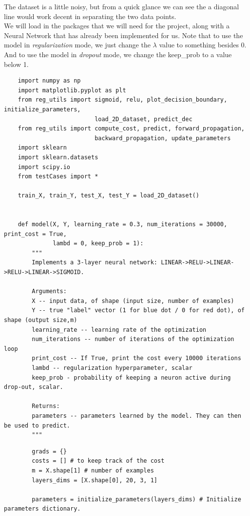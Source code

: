 \documentclass[11pt, a4paper]{article}
\begin{document}
\begin{spacing}{1.1}
\begin{minipage}[c]{8.5cm}
	\end{minipage} \vspace*{1.5mm} \newline
	The dataset is a little noisy, but from a quick glance we can see the a diagonal line would work decent in separating the two data points. \vspace*{1mm} \\
	We will load in the packages that we will need for the project, along with a Neural Network that has already been implemented for us. Note that to use the model in \textit{regularization} mode, we just change the $\lambda$ value to something besides 0. And to use the model in \textit{dropout} mode, we change the keep\_prob to a value below 1. 
	\begin{lstlisting}
	import numpy as np
	import matplotlib.pyplot as plt
	from reg_utils import sigmoid, relu, plot_decision_boundary, initialize_parameters, 
	                      load_2D_dataset, predict_dec
	from reg_utils import compute_cost, predict, forward_propagation, 
	                      backward_propagation, update_parameters
	import sklearn
	import sklearn.datasets
	import scipy.io
	from testCases import *
	
	train_X, train_Y, test_X, test_Y = load_2D_dataset()
	
	
	def model(X, Y, learning_rate = 0.3, num_iterations = 30000, print_cost = True, 
	          lambd = 0, keep_prob = 1):
		"""
		Implements a 3-layer neural network: LINEAR->RELU->LINEAR->RELU->LINEAR->SIGMOID.
		
		Arguments:
		X -- input data, of shape (input size, number of examples)
		Y -- true "label" vector (1 for blue dot / 0 for red dot), of shape (output size,m)
		learning_rate -- learning rate of the optimization
		num_iterations -- number of iterations of the optimization loop
		print_cost -- If True, print the cost every 10000 iterations
		lambd -- regularization hyperparameter, scalar
		keep_prob - probability of keeping a neuron active during drop-out, scalar.
		
		Returns:
		parameters -- parameters learned by the model. They can then be used to predict.
		""" \end{lstlisting} \newpage

	\begin{lstlisting}
		grads = {}
		costs = [] # to keep track of the cost
		m = X.shape[1] # number of examples
		layers_dims = [X.shape[0], 20, 3, 1]
		
		parameters = initialize_parameters(layers_dims) # Initialize parameters dictionary.
		

\end{lstlisting}
\end{spacing}
\end{document}
